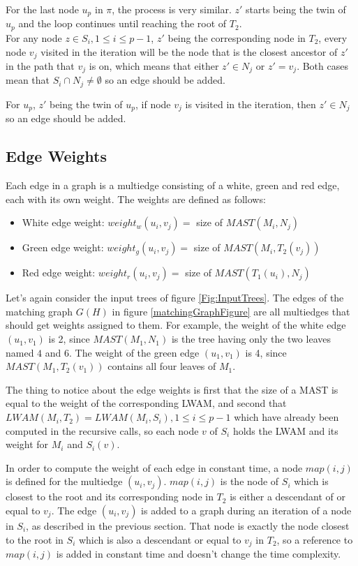 For the last node $u_p$ in $\pi$, the process is very similar. $z'$ starts being the twin of $u_p$ and the loop continues until reaching the root of $T_2$.\\

For any node $z \in S_i, 1 \le i \le p-1$, $z'$ being the corresponding node in $T_2$, every node $v_j$ visited in the iteration will be the node that is the closest ancestor of $z'$ in the path that $v_j$ is on, which means that either $z' \in N_j$ or $z'=v_j$. Both cases mean that $S_i \cap N_j \ne \emptyset$ so an edge should be added.

For $u_p$, $z'$ being the twin of $u_p$, if node $v_j$ is visited in the iteration, then $z' \in N_j$ so an edge should be added.

\subsection{Edge Weights}
Each edge in a graph is a multiedge consisting of a white, green and red edge, each with its own weight. The weights are defined as follows:
\begin{itemize}
	\item White edge weight: $weight_w(u_i, v_j)=$ size of $MAST(M_i,N_j)$
	\item Green edge weight: $weight_g(u_i, v_j)=$ size of $MAST(M_i,T_2(v_j))$
	\item Red edge weight: $weight_r(u_i, v_j)=$ size of $MAST(T_1(u_i),N_j)$
\end{itemize}

Let's again consider the input trees of figure \ref{Fig:InputTrees}. The edges of the matching graph $G(H)$ in figure \ref{matchingGraphFigure} are all multiedges that should get weights assigned to them. For example, the weight of the white edge $(u_1, v_1)$ is 2, since $MAST(M_1,N_1)$ is the tree having only the two leaves named $4$ and $6$. The weight of the green edge $(u_1, v_1)$ is 4, since $MAST(M_1,T_2(v_1))$ contains all four leaves of $M_1$.

The thing to notice about the edge weights is first that the size of a MAST is equal to the weight of the corresponding LWAM, and second that $LWAM(M_i, T_2) = LWAM(M_i, S_i), 1 \le i \le p-1$ which have already been computed in the recursive calls, so each node $v$ of $S_i$ holds the LWAM and its weight for $M_i$ and $S_i(v)$.

In order to compute the weight of each edge in constant time, a node $map(i,j)$ is defined for the multiedge $(u_i,v_j)$. $map(i,j)$ is the node of $S_i$ which is closest to the root and its corresponding node in $T_2$ is either a descendant of or equal to $v_j$. The edge $(u_i,v_j)$ is added to a graph during an iteration of a node in $S_i$, as described in the previous section. That node is exactly the node closest to the root in $S_i$ which is also a descendant or equal to $v_j$ in $T_2$, so a reference to $map(i,j)$ is added in constant time and doesn't change the time complexity.

